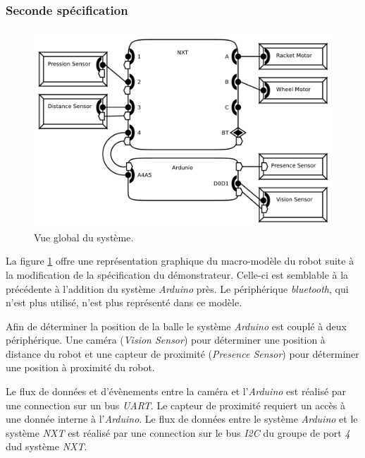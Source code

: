       \subsubsection{Seconde spécification}

      \begin{figure}[!ht]
        \centering
        \includegraphics[scale=0.25]{./img/aadl-robot2.pdf}
        \caption{Vue global du système.}
        \label{fig:aadl-robot2}
      \end{figure}

      La figure \ref{fig:aadl-robot2} offre une représentation graphique du
      macro-modèle du robot suite à la modification de la spécification du
      démonstrateur. Celle-ci est semblable à la précédente à l'addition du
      système {\it Arduino} près. Le périphérique {\it bluetooth}, qui n'est
      plus utilisé, n'est plus représenté dans ce modèle.

      Afin de déterminer la position de la balle le système {\it
        Arduino} est couplé à deux périphérique. Une caméra ({\it Vision
        Sensor}) pour déterminer une position à distance du robot et une capteur
      de proximité ({\it Presence Sensor}) pour déterminer une position à
      proximité du robot. 

      Le flux de données et d'évènements entre la caméra et l'{\it Arduino} est
      réalisé par une connection sur un bus {\it UART}. Le capteur de proximité
      requiert un accès à une donnée interne à l'{\it Arduino}.  Le flux de
      données entre le système {\it Arduino} et le système {\it NXT} est réalisé
      par une connection sur le bus {\it I2C} du groupe de port {\it 4} dud
      système {\it NXT}.

